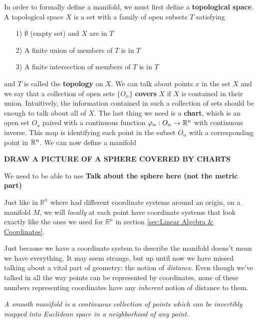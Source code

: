 	
	 In order to formally define a manifold, we must first define a \textbf{topological space}.  
	A topological space $X$ is a set with a family of open subsets $T$ satisfying 
	 \begin{enumerate}
	 	\item[1)] $\emptyset$ (empty set) and $X$ are in $T$
	 	\item[2)] A finite union of members of $T$ is in $T$
	 	\item[3)] A finite intersection of members of $T$ is in $T$
	 \end{enumerate}
	 and $T$ is called the \textbf{topology} on $X$.  We can talk about points $x$ in the set $X$ and we say that a collection of open sets $\{O_\alpha \}$ \textbf{covers} $X$ if $X$ is contained in their union.  Intuitively, the information contained in such a collection of sets should be enough to talk about all of $X$.  The last thing we need is a \textbf{chart}, which is an open set $O_a$ paired with a continuous function $\varphi_\alpha: O_\alpha \to \mathbb{R}^n$ with continuous inverse.  This map is identifying each point in the subset $O_\alpha$ with a corresponding point in $\mathbb{R}^n$.  We can now define a manifold\
	 
	 \textbf{DRAW A PICTURE OF A SPHERE COVERED BY CHARTS}
	
	
	We need to be able to use 
	\textbf{Talk about the sphere here (not the metric part)}
	
	Just like in $\mathbb{R}^n$ where had different coordinate systems around an origin, on a manifold $M$, we will \emph{locally} at each point have coordinate systems that look exactly like the ones we used for $\mathbb{R}^n$ in section \ref{sec:Linear Algebra & Coordinates}. 
	
	Just because we have a coordinate system to describe the manifold doens't mean we have everything. It may seem strange, but up until now we have missed talking about a vital part of geometry: the notion of \emph{distance}. Even though we've talked in all the way points can be represented by coordinates, none of these numbers representing coordinates have any \emph{inherent} notion of distance to them. 
	

	
	\begin{concept}
	\textit{A smooth manifold is a continuous collection of points which can be invertibly mapped into Euclidean space in a neighborhood of any point.}
	\end{concept}

